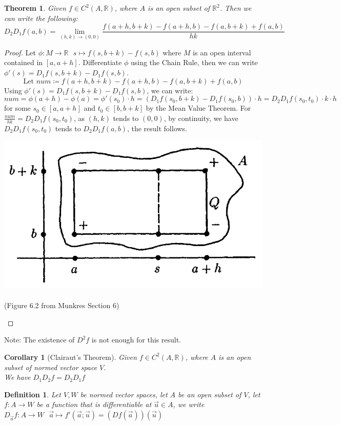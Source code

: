 \documentclass[11pt,oneside]{book}
\theoremstyle{break}
\theoremstyle{break}
\newtheorem{thm}{Theorem}[section]
\newtheorem{corT}[lem]{Corollary}
\newtheorem{defn}{Definition}[corL]
\newcommand{\R}{\mathbb{R}}
\newcommand{\note}{\color{red}Note: \color{black}}
\begin{document}
\begin{thm}
Given $f\in C^2(A,\R)$, where $A$ is an open subset of $\R^2$. Then we can write the following: $$D_2D_1f(a,b) = \lim_{(h,k)\to (0,0)} \frac{f(a+h,b+k)-f(a+h,b)-f(a,b+k)+f(a,b)}{hk}$$
\end{thm}
\begin{proof}
Let $\phi:M\to \R \ \ \ s\mapsto f(s,b+k)-f(s,b)$ where $M$ is an open interval contained in $[a,a+h]$. Differentiate $\phi$ using the Chain Rule, then we can write $\phi'(s) = D_1f(s,b+k) - D_1f(s,b)$. $$\text{Let }num \coloneqq f(a+h,b+k)-f(a+h,b)-f(a,b+k)+f(a,b)$$ Using $\phi'(s) = D_1f(s,b+k) - D_1f(s,b)$, we can write: $$num = \phi(a+h)-\phi(a) = \phi'(s_0)\cdot h = (D_1f(s_0,b+k) - D_1f(s_0,b))\cdot h = D_2D_1f(s_0,t_0)\cdot k \cdot h$$ for some $s_0 \in [a,a+h]$ and $t_0 \in [b, b+k]$ by the Mean Value Theorem. For $\frac{num}{hk} = D_2D_1f(s_0,t_0)$, as $(h,k)$ tends to $(0,0)$, by continuity, we have $D_2D_1f(s_0,t_0)$ tends to $D_2D_1f(a,b)$, the result follows.
\begin{center}
\includegraphics[scale=0.39]{thm6_2.png}${}$\ \ \  \\
(Figure 6.2 from Munkres Section 6)
\end{center}
\end{proof}

\note The existence of $D^2f$ is not enough for this result.\\

\begin{corT}[Clairaut's Theorem]
Given $f\in C^2(A,\R)$, where $A$ is an open subset of normed vector space $V$.\\ We have $D_1D_2f = D_2D_1f$
\end{corT}

\begin{defn}
Let $V,W$ be normed vector spaces, let $A$ be an open subset of $V$, let $f :A \to W$ be a function that is differentiable at $\vec{u}\in A$, we write  $D_{\vec{u}} f:A \to W\ \ \ \vec{a}\mapsto f'(\vec{a};\vec{u}) = (Df(\vec{a}))(\vec{u})$
\end{defn}
\end{document}
